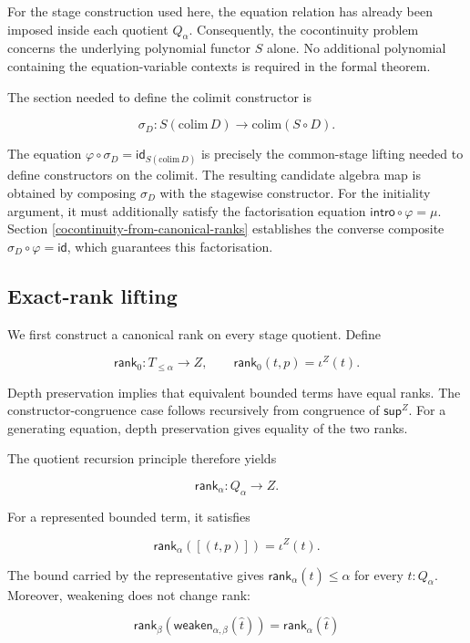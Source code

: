 \documentclass[runningheads]{llncs}
\begin{document}
For the stage construction used here, the equation relation has already
been imposed inside each quotient \(Q_\alpha\).
Consequently, the cocontinuity problem concerns the underlying
polynomial functor \(S\) alone. No additional polynomial containing the
equation-variable contexts is required in the formal theorem.

The section needed to define the colimit constructor is

\[
\sigma_D: S (\mathrm{colim}\,D) \longrightarrow \mathrm{colim}(S\circ D).
\]

The equation \(\varphi\circ\sigma_D = \mathsf{id}_{S (\mathrm{colim}\,D)}\)
is precisely the common-stage lifting needed to define constructors on
the colimit. The resulting candidate algebra map is obtained by
composing \(\sigma_D\) with the stagewise constructor. For the initiality
argument, it must additionally satisfy the factorisation equation
\(\mathsf{intro}\circ\varphi=\mu\). Section \ref{cocontinuity-from-canonical-ranks} establishes the converse
composite \(\sigma_D\circ\varphi=\mathsf{id}\), which guarantees this
factorisation.

\subsection{Exact-rank lifting}\label{exact-rank-lifting}

We first construct a canonical rank on every stage quotient. Define

\[
\mathsf{rank}_0: T_{\leq\alpha}\to Z,
\qquad
\mathsf{rank}_0 (t,p) = \iota^Z (t).
\]

Depth preservation implies that equivalent bounded terms have equal
ranks. The constructor-congruence case follows recursively from
congruence of \(\mathsf{sup}^Z\). For a generating equation, depth
preservation gives equality of the two ranks.

The quotient recursion principle therefore yields

\[
\mathsf{rank}_\alpha: Q_\alpha\to Z.
\]

For a represented bounded term, it satisfies

\[
\mathsf{rank}_\alpha ([(t,p)]) = \iota^Z (t).
\]

The bound carried by the representative gives
\(\mathsf{rank}_\alpha (\widehat{t}) \leq \alpha\) for every
\(\widehat{t}:Q_\alpha\). Moreover, weakening does not
change rank:

\[
\mathsf{rank}_\beta (\mathsf{weaken}_{\alpha,\beta} (\widehat{t}))
= \mathsf{rank}_\alpha (\widehat{t})
\]
\end{document}
